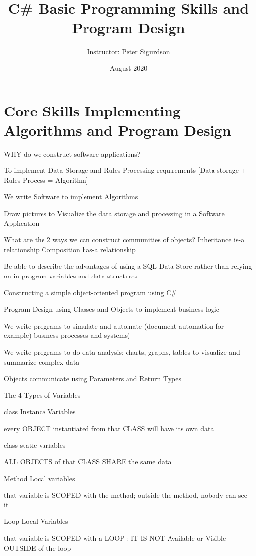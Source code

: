 \documentclass{article}
\title{C\# Basic Programming Skills and Program Design}
\author{Instructor: Peter Sigurdson }
\date{August 2020}
\begin{document}
\maketitle

\section * {Core Skills Implementing Algorithms and Program Design}

\begin{todolist}

    \item    WHY do we construct software applications?
    \item      To implement Data Storage and Rules Processing  requirements [Data storage + Rules Process = Algorithm]
    \item        We write Software to implement Algorithms
    \item    Draw pictures to Visualize the data storage and processing in a Software Application
    \item      What are the 2 ways we can construct communities of objects?
    \subitem        Inheritance
    \subsubitem          is-a relationship
    \subitem        Composition
    \subsubitem          has-a relationship
    \item    Be able to describe the advantages of using a SQL Data Store rather than relying on in-program variables and data structures
    \item Constructing a simple object-oriented program using C\#
    \item   Program Design using Classes and Objects to implement business logic
    \item     We write programs to simulate and automate (document automation for example) business processes and systems)
    \item     We write programs to do data analysis: charts, graphs, tables to visualize and summarize complex data
    \item   Objects communicate using Parameters and Return Types
    \item   The 4 Types of Variables
    \item     class Instance Variables
    \item       every OBJECT instantiated from that CLASS will have its own data
    \item     class static variables
    \item       ALL OBJECTS of that CLASS SHARE the same data
    \item     Method Local variables
    \item       that variable is SCOPED with the method; outside the method, nobody can see it
    \item     Loop Local Variables
    \item       that variable is SCOPED with a LOOP : IT IS NOT Available or Visible OUTSIDE of the loop

\end{todolist}
\end{document}
